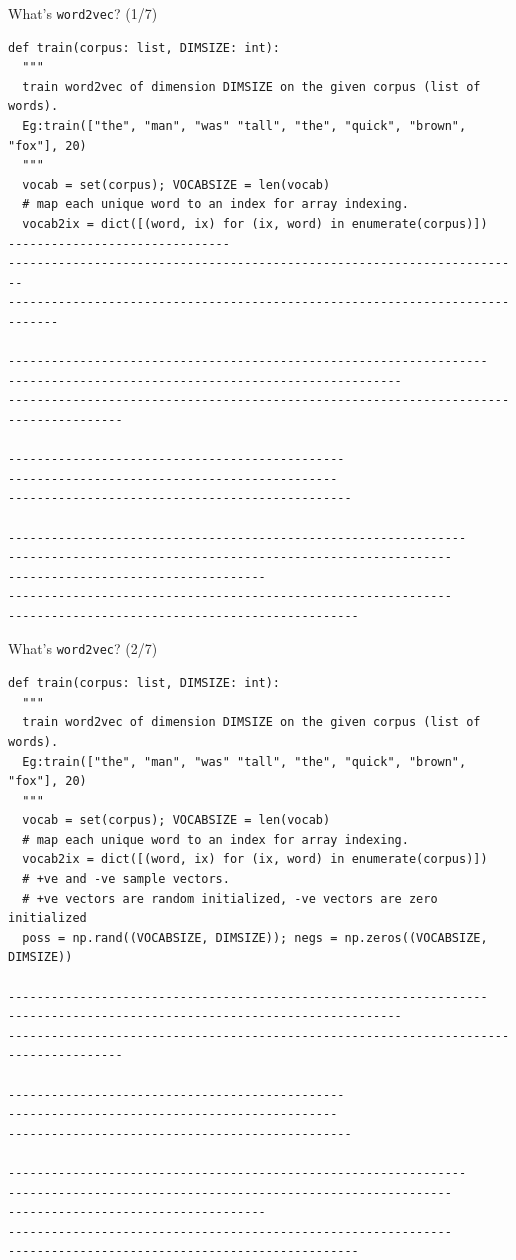 \documentclass[8pt]{beamer}
\begin{document}
\begin{frame}[fragile]{What's \texttt{word2vec}? (1/7)}
\begin{verbatim}
def train(corpus: list, DIMSIZE: int):
  """
  train word2vec of dimension DIMSIZE on the given corpus (list of words).
  Eg:train(["the", "man", "was" "tall", "the", "quick", "brown", "fox"], 20)
  """
  vocab = set(corpus); VOCABSIZE = len(vocab)
  # map each unique word to an index for array indexing.
  vocab2ix = dict([(word, ix) for (ix, word) in enumerate(corpus)])
-------------------------------
------------------------------------------------------------------------
-----------------------------------------------------------------------------

-------------------------------------------------------------------
-------------------------------------------------------
--------------------------------------------------------------------------------------

-----------------------------------------------
----------------------------------------------
------------------------------------------------

----------------------------------------------------------------
--------------------------------------------------------------
------------------------------------
--------------------------------------------------------------
-------------------------------------------------
\end{verbatim}
\end{frame}

\begin{frame}[fragile]{What's \texttt{word2vec}? (2/7)}
\begin{verbatim}
def train(corpus: list, DIMSIZE: int):
  """
  train word2vec of dimension DIMSIZE on the given corpus (list of words).
  Eg:train(["the", "man", "was" "tall", "the", "quick", "brown", "fox"], 20)
  """
  vocab = set(corpus); VOCABSIZE = len(vocab)
  # map each unique word to an index for array indexing.
  vocab2ix = dict([(word, ix) for (ix, word) in enumerate(corpus)])
  # +ve and -ve sample vectors.
  # +ve vectors are random initialized, -ve vectors are zero initialized
  poss = np.rand((VOCABSIZE, DIMSIZE)); negs = np.zeros((VOCABSIZE, DIMSIZE))

-------------------------------------------------------------------
-------------------------------------------------------
--------------------------------------------------------------------------------------

-----------------------------------------------
----------------------------------------------
------------------------------------------------

----------------------------------------------------------------
--------------------------------------------------------------
------------------------------------
--------------------------------------------------------------
-------------------------------------------------
\end{verbatim}
\end{frame}
\end{document}
